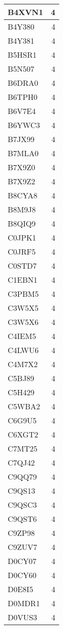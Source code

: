 \documentclass[
]{book}
\theoremstyle{definition}
\theoremstyle{definition}
\theoremstyle{definition}
\theoremstyle{definition}
\theoremstyle{remark}
\begin{document}
\begin{table}
\begin{tabular}{l|r}
\hline
B4XVN1 & 4\\
\hline
B4Y380 & 4\\
\hline
B4Y381 & 4\\
\hline
B5HSR1 & 4\\
\hline
B5N507 & 4\\
\hline
B6DRA0 & 4\\
\hline
B6TPH0 & 4\\
\hline
B6V7E4 & 4\\
\hline
B6YWC3 & 4\\
\hline
B7JX99 & 4\\
\hline
B7MLA0 & 4\\
\hline
B7X9Z0 & 4\\
\hline
B7X9Z2 & 4\\
\hline
B8CYA8 & 4\\
\hline
B8M9J8 & 4\\
\hline
B8QIQ9 & 4\\
\hline
C0JPK1 & 4\\
\hline
C0JRF5 & 4\\
\hline
C0STD7 & 4\\
\hline
C1EBN1 & 4\\
\hline
C3PBM5 & 4\\
\hline
C3W5X5 & 4\\
\hline
C3W5X6 & 4\\
\hline
C4IEM5 & 4\\
\hline
C4LWU6 & 4\\
\hline
C4M7X2 & 4\\
\hline
C5BJ89 & 4\\
\hline
C5H429 & 4\\
\hline
C5WBA2 & 4\\
\hline
C6G9U5 & 4\\
\hline
C6XGT2 & 4\\
\hline
C7MT25 & 4\\
\hline
C7QJ42 & 4\\
\hline
C9QQ79 & 4\\
\hline
C9QS13 & 4\\
\hline
C9QSC3 & 4\\
\hline
C9QST6 & 4\\
\hline
C9ZP98 & 4\\
\hline
C9ZUV7 & 4\\
\hline
D0CY07 & 4\\
\hline
D0CY60 & 4\\
\hline
D0E8I5 & 4\\
\hline
D0MDR1 & 4\\
\hline
D0VUS3 & 4\\

\end{tabular}
\end{table}
\end{document}
